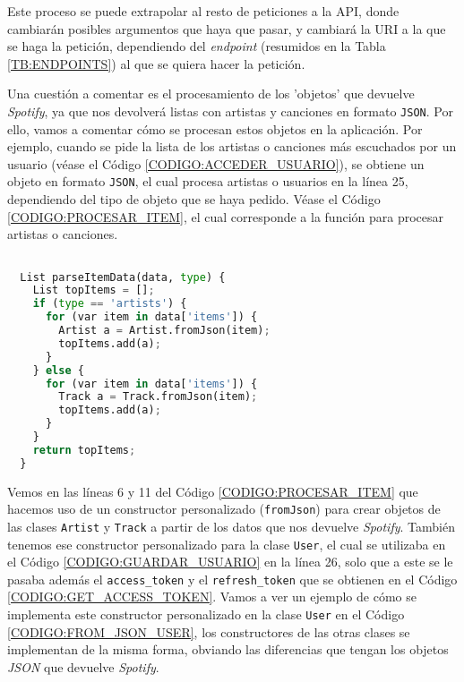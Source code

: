 Este proceso se puede extrapolar al resto de peticiones a la API, donde cambiarán posibles argumentos que haya que pasar, y cambiará la URI a la que se haga la petición,
dependiendo del \textit{endpoint} (resumidos en la Tabla \ref{TB:ENDPOINTS}) al que se quiera hacer la petición.

Una cuestión a comentar es el procesamiento de los 'objetos' que devuelve \textit{Spotify}, ya que nos devolverá listas con 
artistas y canciones en formato \texttt{JSON}. Por ello, vamos a comentar cómo se procesan estos objetos en la aplicación. Por ejemplo, cuando 
se pide la lista de los artistas o canciones más escuchados por un usuario (véase el Código \ref{CODIGO:ACCEDER_USUARIO}), se obtiene un objeto en formato \texttt{JSON}, el cual procesa 
artistas o usuarios en la línea 25, dependiendo del tipo de objeto que se haya pedido. Véase el Código \ref{CODIGO:PROCESAR_ITEM}, el cual corresponde
a la función para procesar artistas o canciones.

\begin{lstlisting}[language=python, caption=Procesar objeto en formato \textit{JSON}, label=CODIGO:PROCESAR_ITEM]

  List parseItemData(data, type) {
    List topItems = [];
    if (type == 'artists') {
      for (var item in data['items']) {
        Artist a = Artist.fromJson(item);
        topItems.add(a);
      }
    } else {
      for (var item in data['items']) {
        Track a = Track.fromJson(item);
        topItems.add(a);
      }
    }
    return topItems;
  }

\end{lstlisting}

Vemos en las líneas 6 y 11 del Código \ref{CODIGO:PROCESAR_ITEM} que hacemos uso de un constructor personalizado (\texttt{fromJson}) 
para crear objetos de las clases \texttt{Artist} y \texttt{Track} a partir de los datos que nos devuelve \textit{Spotify}. También tenemos 
ese constructor personalizado para la clase \texttt{User}, el cual se utilizaba en el Código \ref{CODIGO:GUARDAR_USUARIO} en la línea 26, solo
que a este se le pasaba además el \texttt{access\_token} y el \texttt{refresh\_token} que se obtienen en el Código \ref{CODIGO:GET_ACCESS_TOKEN}.
Vamos a ver un ejemplo de cómo se implementa este constructor personalizado en la clase \texttt{User} en el Código \ref{CODIGO:FROM_JSON_USER}, los 
constructores de las otras clases se implementan de la misma forma, obviando las diferencias que tengan los objetos \textit{JSON} que devuelve \textit{Spotify}.

